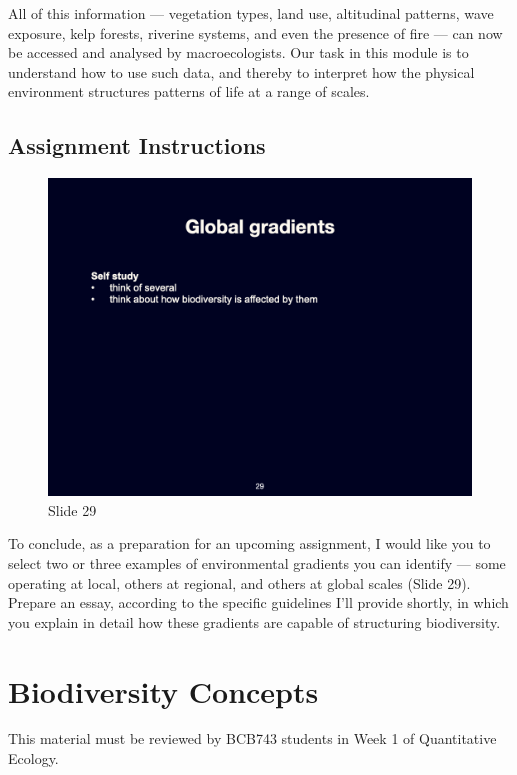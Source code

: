 \documentclass[
  11pt,
]{book}
\begin{document}
All of this information --- vegetation types, land use, altitudinal
patterns, wave exposure, kelp forests, riverine systems, and even the
presence of fire --- can now be accessed and analysed by
macroecologists. Our task in this module is to understand how to use
such data, and thereby to interpret how the physical environment
structures patterns of life at a range of scales.

\section{Assignment Instructions}\label{assignment-instructions}

\begin{figure}[ht]
\centering
\includegraphics[width=0.8\linewidth]{../images/BDC334/BDC334-029.jpeg}
\caption*{Slide 29}
\end{figure}

To conclude, as a preparation for an upcoming assignment, I would like
you to select two or three examples of environmental gradients you can
identify --- some operating at local, others at regional, and others at
global scales (Slide 29). Prepare an essay, according to the specific
guidelines I'll provide shortly, in which you explain in detail how
these gradients are capable of structuring biodiversity.

\chapter{Biodiversity Concepts}\label{biodiversity-concepts}

\begin{tcolorbox}[enhanced jigsaw, arc=.35mm, titlerule=0mm, colframe=quarto-callout-note-color-frame, title=\textcolor{quarto-callout-note-color}{\faInfo}\hspace{0.5em}{BCB743}, colbacktitle=quarto-callout-note-color!10!white, opacityback=0, rightrule=.15mm, coltitle=black, left=2mm, bottomtitle=1mm, toptitle=1mm, toprule=.15mm, bottomrule=.15mm, leftrule=.75mm, opacitybacktitle=0.6, colback=white, breakable]

This material must be reviewed by BCB743 students in Week 1 of
Quantitative Ecology.

\end{tcolorbox}
\end{document}
